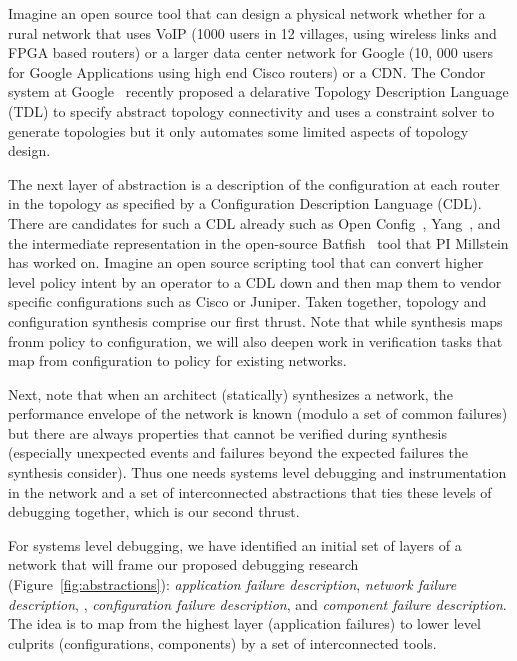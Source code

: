 Imagine an open source tool that can design a physical network whether
for a rural network that uses VoIP (1000 users in 12 villages, using wireless links and FPGA based routers) or a larger data center network for Google (10, 000 users for Google Applications using high end Cisco routers) or a CDN. The Condor system at
Google~\cite{condor} recently proposed a delarative Topology
Description Language (TDL) to specify abstract topology connectivity
and uses a constraint solver to generate topologies but it only automates
some limited aspects of topology design.

The next layer of abstraction is a description of the configuration at each router in the topology as specified
by a Configuration Description Language (CDL).  There are candidates for such a CDL already such as 
Open Config~\cite{openconfig}, Yang~\cite{yang}, and the intermediate representation in the open-source Batfish~\cite{batfish} tool that PI Millstein has worked on.  Imagine an open source scripting tool that 
can convert higher level policy intent by an operator to a CDL down and then map them to vendor specific
configurations such as Cisco or Juniper. Taken together, topology and configuration synthesis comprise our
first thrust. Note that while synthesis maps fronm policy to configuration, we will also deepen work in verification tasks that map from configuration to policy for existing networks.

Next, note that when an architect (statically) synthesizes a network, the performance envelope of the 
network is known (modulo a set of common failures) but there are always properties that cannot be verified during synthesis  (especially unexpected events and failures beyond the expected failures the synthesis
consider). Thus one needs systems level debugging and instrumentation in the network and a set of
interconnected abstractions that ties these levels of debugging together, which is our second thrust.

For systems level debugging, we have identified an initial set of layers of
a network that will frame our proposed debugging research
(Figure~\ref{fig:abstractions}): {\em application failure description}, {\em network failure description}, ,  
{\em configuration failure description}, and {\em component failure description}.  The idea is to map 
from the highest layer (application failures) to lower level culprits (configurations, components) by a set
of interconnected tools.

